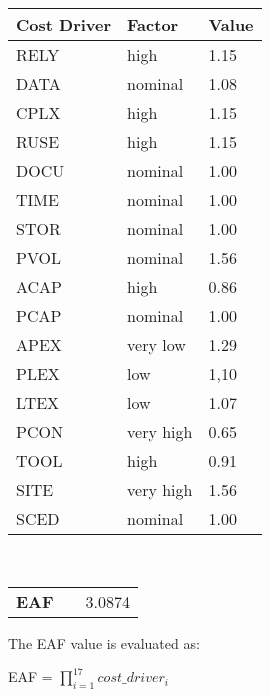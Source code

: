 \begin{center}
  \begin{tabular}{ l | l | l }%
   	\hline
	\textbf{Cost Driver} & \textbf{Factor} & \textbf{Value}
   	\\ \hline
    RELY & high & 1.15
    \\\hline
    DATA & nominal & 1.08
    \\\hline
    CPLX & high & 1.15
    \\\hline
    RUSE &  high & 1.15
 	\\\hline
 	DOCU  & nominal & 1.00
   	\\\hline 
    TIME  & nominal & 1.00
   	\\\hline 
   	STOR  & nominal & 1.00
   	\\\hline 
   	PVOL  & nominal & 1.56
   	\\\hline 
   	ACAP  & high & 0.86
   	\\\hline 
   	PCAP  & nominal & 1.00
   	\\\hline 
   	APEX  & very low & 1.29
   	\\\hline 
   	PLEX  & low & 1,10
   	\\\hline 
   	LTEX  & low & 1.07
   	\\\hline 
   	PCON  & very high & 0.65
   	\\\hline 
   	TOOL  & high & 0.91
   	\\\hline 
   	SITE  & very high & 1.56
   	\\\hline 
   	SCED  & nominal& 1.00
   	\\\hline 
  \end{tabular}
  \\\begin{tabular}{ l l | l }%
   	\\\textbf{EAF} & & 3.0874
  \end{tabular}
\end{center}

The EAF value is evaluated as: 
\\\begin{center}EAF = $\prod_{i=1}^{17} cost\_driver_i$ \end{center}

